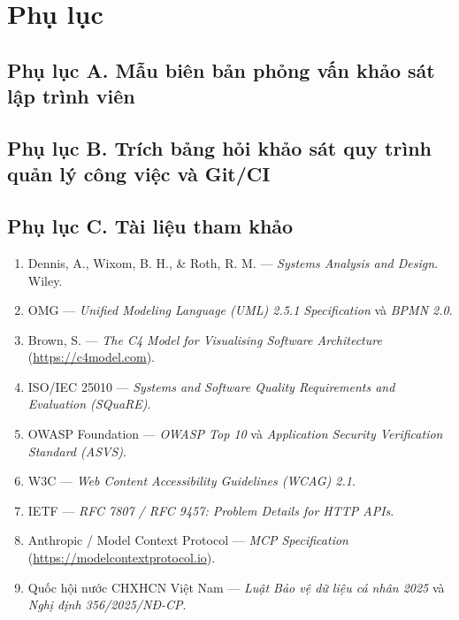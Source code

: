 
\clearpage
{}
\section*{Phụ lục}


\subsection*{Phụ lục A. Mẫu biên bản phỏng vấn khảo sát lập trình viên}

\subsection*{Phụ lục B. Trích bảng hỏi khảo sát quy trình quản lý công việc và Git/CI}

\subsection*{Phụ lục C. Tài liệu tham khảo}
\begin{enumerate}
  \item Dennis, A., Wixom, B. H., \& Roth, R. M. --- \emph{Systems Analysis and Design}. Wiley.
  \item OMG --- \emph{Unified Modeling Language (UML) 2.5.1 Specification} và \emph{BPMN 2.0}.
  \item Brown, S. --- \emph{The C4 Model for Visualising Software Architecture} (\url{https://c4model.com}).
  \item ISO/IEC 25010 --- \emph{Systems and Software Quality Requirements and Evaluation (SQuaRE)}.
  \item OWASP Foundation --- \emph{OWASP Top 10} và \emph{Application Security Verification Standard (ASVS)}.
  \item W3C --- \emph{Web Content Accessibility Guidelines (WCAG) 2.1}.
  \item IETF --- \emph{RFC 7807 / RFC 9457: Problem Details for HTTP APIs}.
  \item Anthropic / Model Context Protocol --- \emph{MCP Specification} (\url{https://modelcontextprotocol.io}).
  \item Quốc hội nước CHXHCN Việt Nam --- \emph{Luật Bảo vệ dữ liệu cá nhân 2025} và \emph{Nghị định 356/2025/NĐ-CP}.
\end{enumerate}
